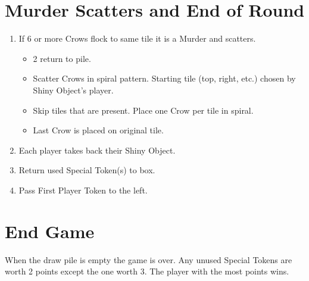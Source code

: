 \documentclass[12pt]{article}
\newenvironment{enumerateCustom}
{\begin{enumerate}
  \setlength{\itemsep}{1pt}
  \setlength{\parskip}{0pt}
  \setlength{\parsep}{0pt}}
{\end{enumerate}}
\newenvironment{itemizeCustom}
{\begin{itemize}
  \setlength{\itemsep}{1pt}
  \setlength{\parskip}{0pt}
  \setlength{\parsep}{0pt}}
{\end{itemize}}
\begin{document}
\begin{mdframed}[style = customFrame]
\begin{multicols*}{2}
\section*{Murder Scatters and End of Round}
\begin{enumerateCustom}
	\item If 6 or more Crows flock to same tile it is a Murder and scatters.
		\begin{itemizeCustom}
			\item 2 return to pile.
			\item Scatter Crows in spiral pattern. Starting tile (top, right, etc.) chosen by Shiny Object's player.
			\item Skip tiles that are present. Place one Crow per tile in spiral.
			\item Last Crow is placed on original tile.
		\end{itemizeCustom}
	\item Each player takes back their Shiny Object.
	\item Return used Special Token(s) to box.
	\item Pass First Player Token to the left.
\end{enumerateCustom}

\section*{End Game}
When the draw pile is empty the game is over. Any unused Special Tokens are worth 2 points except the one worth 3. The player with the most points wins.

\end{multicols*}
\end{mdframed}
\end{document}
